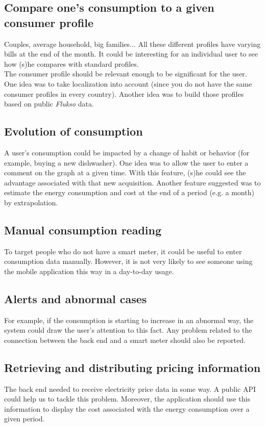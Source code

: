 \documentclass[a4paper, oneside, 11pt]{book}
\begin{document}
\subsection{Compare one’s consumption to a given consumer profile}
Couples, average household, big families... All these different profiles have varying bills at the end of the month. It could be interesting for an individual user to see how (s)he compares with standard profiles.\\

The consumer profile should be relevant enough to be significant for the user. One idea was to take localization into account (since you do not have the same consumer profiles in every country). Another idea was to build those profiles based on public \textit{Flukso} data. 

\subsection{Evolution of consumption}
A user’s consumption could be impacted by a change of habit or behavior (for example, buying a new dishwasher). One idea was to allow the user to enter a comment on the graph at a given time. With this feature, (s)he could see the advantage associated with that new acquisition. Another feature suggested was to estimate the energy consumption and cost at the end of a period (e.g. a month) by extrapolation.

\subsection{Manual consumption reading}
To target people who do not have a smart meter, it could be useful to enter consumption data manually. However, it is not very likely to see someone using the mobile application this way in a day-to-day usage.

\subsection{Alerts and abnormal cases}
For example, if the consumption is starting to increase in an abnormal way, the system could draw the user’s attention to this fact. Any problem related to the connection between the back end and a smart meter should also be reported.

\subsection{Retrieving and distributing pricing information}
The back end needed to receive electricity price data in some way. A public API could help us to tackle this problem. Moreover, the application should use this information to display the cost associated with the energy consumption over a given period.
\end{document}
